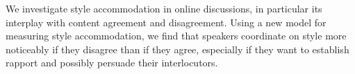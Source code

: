 We investigate style accommodation in online discussions, in particular its interplay with content agreement and disagreement. Using a new model for measuring style accommodation, we find that speakers coordinate on style more noticeably if they disagree than if they agree, especially if they want to establish  rapport and possibly persuade their interlocutors.

